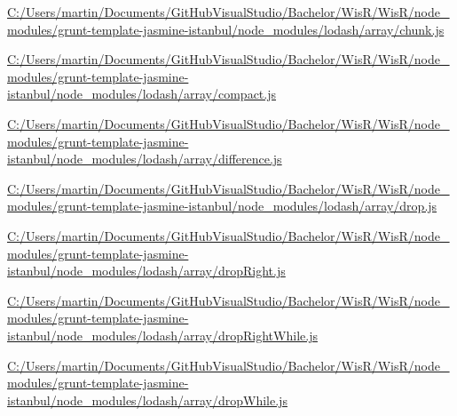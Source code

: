 \begin{DoxyCompactItemize}
\item 
\hyperlink{_c_1_2_users_2martin_2_documents_2_git_hub_visual_studio_2_bachelor_2_wis_r_2_wis_r_2node_module33d0d7492b0d375618362eed378ac87d}{C\+:/\+Users/martin/\+Documents/\+Git\+Hub\+Visual\+Studio/\+Bachelor/\+Wis\+R/\+Wis\+R/node\+\_\+modules/grunt-\/template-\/jasmine-\/istanbul/node\+\_\+modules/lodash/array/chunk.\+js}
\item 
\hyperlink{_c_1_2_users_2martin_2_documents_2_git_hub_visual_studio_2_bachelor_2_wis_r_2_wis_r_2node_module61f985b6a058cd1c408a9e70ada180a6}{C\+:/\+Users/martin/\+Documents/\+Git\+Hub\+Visual\+Studio/\+Bachelor/\+Wis\+R/\+Wis\+R/node\+\_\+modules/grunt-\/template-\/jasmine-\/istanbul/node\+\_\+modules/lodash/array/compact.\+js}
\item 
\hyperlink{_c_1_2_users_2martin_2_documents_2_git_hub_visual_studio_2_bachelor_2_wis_r_2_wis_r_2node_module9dc42adaa0a5d3326ce46f3968e47387}{C\+:/\+Users/martin/\+Documents/\+Git\+Hub\+Visual\+Studio/\+Bachelor/\+Wis\+R/\+Wis\+R/node\+\_\+modules/grunt-\/template-\/jasmine-\/istanbul/node\+\_\+modules/lodash/array/difference.\+js}
\item 
\hyperlink{_c_1_2_users_2martin_2_documents_2_git_hub_visual_studio_2_bachelor_2_wis_r_2_wis_r_2node_modulea5c76f4e266006bfde185b789d4f64a9}{C\+:/\+Users/martin/\+Documents/\+Git\+Hub\+Visual\+Studio/\+Bachelor/\+Wis\+R/\+Wis\+R/node\+\_\+modules/grunt-\/template-\/jasmine-\/istanbul/node\+\_\+modules/lodash/array/drop.\+js}
\item 
\hyperlink{_c_1_2_users_2martin_2_documents_2_git_hub_visual_studio_2_bachelor_2_wis_r_2_wis_r_2node_module5561efd558d4cdc66a1a337a8684db8d}{C\+:/\+Users/martin/\+Documents/\+Git\+Hub\+Visual\+Studio/\+Bachelor/\+Wis\+R/\+Wis\+R/node\+\_\+modules/grunt-\/template-\/jasmine-\/istanbul/node\+\_\+modules/lodash/array/drop\+Right.\+js}
\item 
\hyperlink{_c_1_2_users_2martin_2_documents_2_git_hub_visual_studio_2_bachelor_2_wis_r_2_wis_r_2node_moduleaa409de786dd475774e1a346d03d13b1}{C\+:/\+Users/martin/\+Documents/\+Git\+Hub\+Visual\+Studio/\+Bachelor/\+Wis\+R/\+Wis\+R/node\+\_\+modules/grunt-\/template-\/jasmine-\/istanbul/node\+\_\+modules/lodash/array/drop\+Right\+While.\+js}
\item 
\hyperlink{_c_1_2_users_2martin_2_documents_2_git_hub_visual_studio_2_bachelor_2_wis_r_2_wis_r_2node_module6c7fd154a53e7b2267a868252c2c0d6c}{C\+:/\+Users/martin/\+Documents/\+Git\+Hub\+Visual\+Studio/\+Bachelor/\+Wis\+R/\+Wis\+R/node\+\_\+modules/grunt-\/template-\/jasmine-\/istanbul/node\+\_\+modules/lodash/array/drop\+While.\+js}

\end{DoxyCompactItemize}
